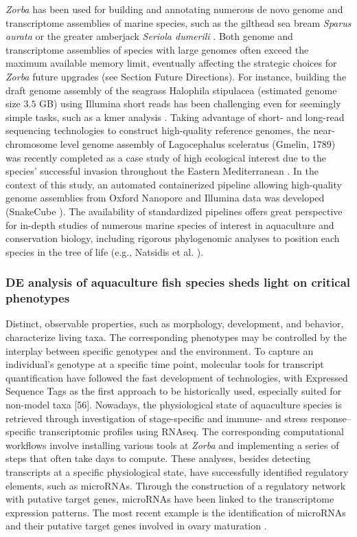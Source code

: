    \textit{Zorba} has been used for building and annotating numerous de novo genome and transcriptome assemblies of marine species, such as the gilthead sea bream \textit{Sparus aurata} \citep{pauletto2018genomic} or the greater amberjack \textit{Seriola dumerili} \citep{sarropoulou2017full}. 
   Both genome and transcriptome assemblies of species with large genomes often exceed the maximum available memory limit, eventually affecting the strategic choices for \textit{Zorba} future upgrades (see Section Future Directions). 
   For instance, building the draft genome assembly of the seagrass Halophila stipulacea (estimated genome size $3.5$ GB) using Illumina short reads has been challenging even for seemingly simple tasks, such as a kmer analysis \citep{tsakogiannis2020importance}. 
   Taking advantage of short- and long-read sequencing technologies to construct high-quality reference genomes, the near-chromosome level genome assembly of Lagocephalus sceleratus (Gmelin, 1789) was recently completed as a case study of high ecological interest due to the species' successful invasion throughout the Eastern Mediterranean \citep{danis2020building}. 
   In the context of this study, an automated containerized pipeline allowing high-quality genome assemblies from Oxford Nanopore and Illumina data was developed (SnakeCube \citep{nelina_angelova_2021_4670966}). 
   The availability of standardized pipelines offers great perspective for in-depth studies of numerous marine species of interest in aquaculture and conservation biology, including rigorous phylogenomic analyses to position each species in the tree of life (e.g., Natsidis et al. \citep{natsidis2019phylogenomics}).

   \subsubsection*{DE analysis of aquaculture fish species sheds light on critical phenotypes}

   Distinct, observable properties, such as morphology, development, and behavior, characterize living taxa. 
   The corresponding phenotypes may be controlled by the interplay between specific genotypes and the environment. 
   To capture an individual's genotype at a specific time point, molecular tools for transcript quantification have followed the fast development of technologies, with Expressed Sequence Tags as the first approach to be historically used, especially suited for non-model taxa [56]. 
   Nowadays, the physiological state of aquaculture species is retrieved through investigation of stage-specific and immune- and stress response–specific transcriptomic profiles using RNAseq. 
   The corresponding computational workflows involve installing various tools at \textit{Zorba} and implementing a series of steps that often take days to compute. 
   These analyses, besides detecting transcripts at a specific physiological state, have successfully identified regulatory elements, such as microRNAs. 
   Through the construction of a regulatory network with putative target genes, microRNAs have been linked to the transcriptome expression patterns. 
   The most recent example is the identification of microRNAs and their putative target genes involved in ovary maturation \citep{papadaki2020non}.

